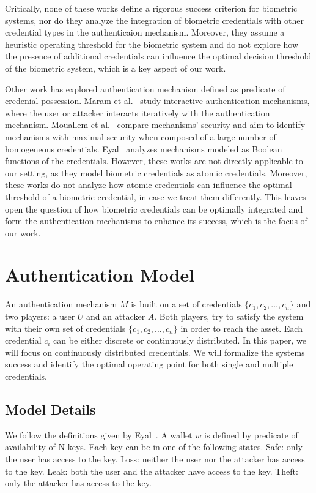 \documentclass[sigconf]{acmart}
\theoremstyle{definition}
\begin{document}
Critically, none of these works define a rigorous success criterion for biometric systems, nor do they analyze the integration of biometric credentials with other credential types in the authenticaion mechanism. Moreover, they assume a heuristic operating threshold for the biometric system and do not explore how the presence of additional credentials can influence the optimal decision threshold of the biometric system, which is a key aspect of our work.

Other work has explored authentication mechanism defined as predicate of credenial possession. Maram et al.~\cite{maram2024} study interactive authentication mechanisms, where the user or attacker interacts iteratively with the authentication mechanism. Mouallem et al.~\cite{mouallem2024} compare mechanisms' security and aim to identify mechanisms with maximal security when composed of a large number of homogeneous credentials. Eyal~\cite{Eyal2021} analyzes mechanisms modeled as Boolean functions of the credentials. However, these works are not directly applicable to our setting, as they model biometric credentials as atomic credentials. Moreover, these works do not analyze how atomic credentials can influence the optimal threshold of a biometric credential, in case we treat them differently. This leaves open the question of how biometric credentials can be optimally integrated and form the authentication mechanisms to enhance its success, which is the focus of our work.

\section{Authentication Model}\label{sec:3}
An authentication mechanism $M$ is built on a set of credentials $\{c_1, c_2, \ldots, c_n\}$ and two players: a user $U$ and an attacker $A$. Both players, try to satisfy the system with their own set of credentials $\{c_1, c_2, \ldots, c_n\}$ in order to reach the asset. Each credential $c_i$ can be either discrete or continuously distributed. In this paper, we will focus on continuously distributed credentials. We will formalize the systems success and identify the optimal operating point for both single and multiple credentials.
\subsection{Model Details}
We follow the definitions given by Eyal~\cite{Eyal2021}. A wallet $w$ is defined by predicate of availability of N keys. Each key can be in one of the following states. Safe: only the user has access to the key. Loss: neither the user nor the attacker has access to the key. Leak: both the user and the attacker have access to the key. Theft: only the attacker has access to the key.
\end{document}
